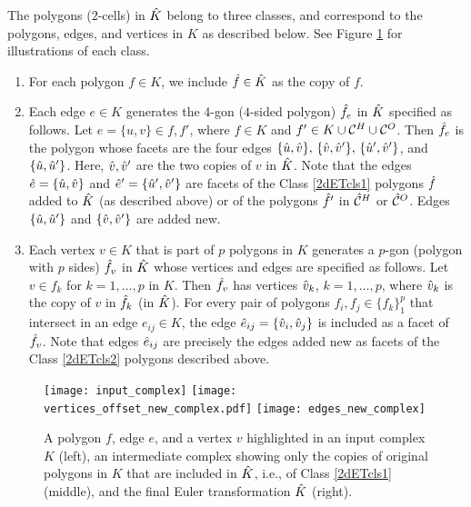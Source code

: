 The polygons ($2$-cells) in $\hat{K}$ belong to three classes, and correspond to the polygons, edges, and vertices in $K$ as described below.
See Figure \ref{fig:3types2cells2d} for illustrations of each class.
\begin{enumerate}
  \item \label{2dETcls1}
    For each polygon $f \in K$, we include $\hat{f} \in \hat{K}$ as the copy of $f$.

  \item \label{2dETcls2}
    Each edge $e \in K$ generates the $4$-gon ($4$-sided polygon) $\hat{f}_e$ in $\hat{K}$ specified as follows.
    Let $e = \{u,v\} \in f,f'$, where $f \in K$ and $f' \in K \cup \mathcal{C}^H \cup \mathcal{C}^O$.
    Then $\hat{f}_e$ is the polygon whose facets are the four edges $\{\hat{u},\hat{v}\}, \, \{\hat{v},\hat{v}'\}, \, \{\hat{u}',\hat{v}'\}$, and $\{\hat{u},\hat{u}'\}$.
    Here, $\hat{v}, \hat{v}'$ are the two copies of $v$ in $\hat{K}$.
    Note that the edges $\hat{e} = \{\hat{u},\hat{v}\}$ and $\hat{e}' =  \{\hat{u}',\hat{v}'\}$ are facets of the Class \ref{2dETcls1} polygons $\hat{f}$ added to $\hat{K}$ (as described above) or of the polygons $\hat{f}'$ in $\hat{\mathcal{C}}^H$ or $\hat{\mathcal{C}}^O$.
    Edges $\{\hat{u},\hat{u}'\}$ and $\{\hat{v},\hat{v}'\}$ are added new.
    
  \item \label{2dETcls3}
    Each vertex $v \in K$ that is part of $p$ polygons in $K$ generates a $p$-gon (polygon with $p$ sides) $\hat{f}_v$ in $\hat{K}$ whose vertices and edges are specified as follows.
    Let $v \in f_k$ for $k=1,\dots,p$ in $K$.
    Then $\hat{f}_v$ has vertices $\hat{v}_k$, $k=1,\dots,p$, where $\hat{v}_k$ is the copy of $v$ in $\hat{f}_k$ (in $\hat{K}$).
    For every pair of polygons $f_i,f_j \in \{f_k\}_1^p$ that intersect in an edge $e_{ij} \in K$, the edge $\hat{e}_{ij} = \{\hat{v}_i, \hat{v}_j\}$ is included as a facet of $\hat{f}_v$.
    Note that edges $\hat{e}_{ij}$ are precisely the edges added new as facets of the Class \ref{2dETcls2} polygons described above.
\end{enumerate}
%
\begin{figure}[htp!]
  \centering
  \texttt{[image: input\_complex]}
  \quad
  \texttt{[image: vertices\_offset\_new\_complex.pdf]}
  \quad
  \texttt{[image: edges\_new\_complex]}
  \caption{A polygon $f$, edge $e$, and a vertex $v$ highlighted in an input complex $K$ (left),
    an intermediate complex showing only the copies of original polygons in $K$ that are included in $\hat{K}$, i.e., of Class \ref{2dETcls1} (middle),
    and the final Euler transformation $\hat{K}$ (right).}
  \label{fig:3types2cells2d}
\end{figure}


